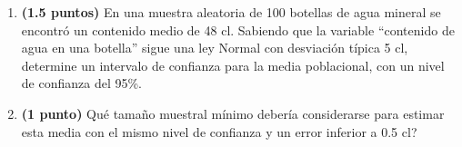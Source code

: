 
\begin{enumerate}[label=\alph*)]
\item \textbf{(1.5 puntos)} En una muestra aleatoria de 100 botellas de agua mineral se encontró un contenido medio de 48 cl. Sabiendo que la variable ``contenido de agua en una botella'' sigue una ley Normal con desviación típica 5 cl, determine un intervalo de confianza para la media poblacional, con un nivel de confianza del 95\%.
\item \textbf{(1 punto)} \textquestiondown{}Qué tamaño muestral mínimo debería considerarse para estimar esta media con el mismo nivel de confianza y un error inferior a 0.5 cl?
\end{enumerate}
